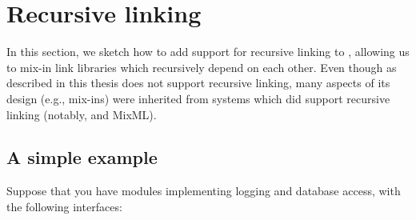 
\chapter{Recursive linking}
\label{sec:recursive-linking}

In this section, we sketch how to add support for recursive linking to
\Backpack{}, allowing us to mix-in link libraries which recursively
depend on each other.  Even though \Backpack{} as described in this
thesis does not support recursive linking, many aspects of its design
(e.g., mix-ins) were inherited from systems which did support recursive
linking (notably, \OldBackpack{} and MixML).


\section{A simple example}

Suppose that you have modules implementing logging and database access,
with the following interfaces:

